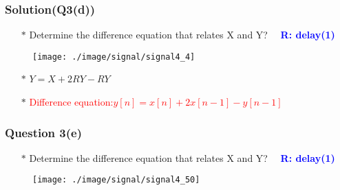 \documentclass{beamer}
\newcommand{\blue}[1]{\textcolor{blue}{#1}}
\newcommand{\red}[1]{\textcolor{red}{#1}}
\begin{document}
\begin{frame}
\frametitle{Solution(Q3(d))}

\begin{itemize} \itemsep1pt \parskip0pt 
  \item[$\ast$] Determine the difference equation that relates X and Y?  ~~\blue{\bf R: delay(1)}
\end{itemize}



\begin{figure}[H]
  \centering
  \texttt{[image: ./image/signal/signal4\_4]}
\end{figure}

\begin{itemize} \itemsep1pt \parskip0pt 
  \item[$\ast$] $Y = X+ 2RY - RY$
  \item[$\ast$] \red{Difference equation:$y[n] = x[n] + 2x[n-1] - y[n-1]$}
\end{itemize}

\end{frame}


\begin{frame}
\frametitle{Question 3(e)}

\begin{itemize} \itemsep1pt \parskip0pt 
  \item[$\ast$] Determine the difference equation that relates X and Y?  ~~\blue{\bf R: delay(1)}
\end{itemize}
\vspace{10 mm}


\begin{figure}[H]
  \centering
  \texttt{[image: ./image/signal/signal4\_50]}
\end{figure}


\end{frame}

\end{document}
